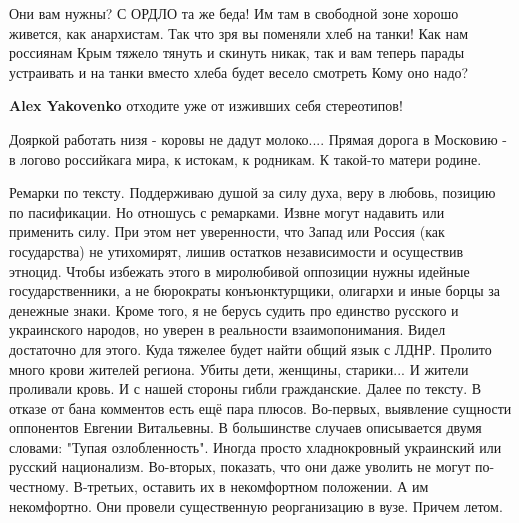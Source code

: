 \begin{itemize}
\begin{itemize}
Они вам нужны? С ОРДЛО та же беда! Им там в свободной зоне хорошо живется, как
анархистам. Так что зря вы поменяли хлеб на танки! Как нам россиянам Крым
тяжело тянуть и скинуть никак, так и вам теперь парады устраивать и на танки
вместо хлеба будет весело смотреть Кому оно надо?

 
\textbf{Alex Yakovenko} отходите уже от изживших себя стереотипов!

\end{itemize}

 

Дояркой работать низя - коровы не дадут молоко.... Прямая дорога в Московию - в
логово российкага мира, к истокам, к родникам. К такой-то матери родине.


 

Ремарки по тексту. Поддерживаю душой за силу духа, веру в любовь, позицию по
пасификации. Но отношусь с ремарками. Извне могут надавить или применить силу.
При этом нет уверенности, что Запад или Россия (как государства) не утихомирят,
лишив остатков независимости и осуществив этноцид. Чтобы избежать этого в
миролюбивой оппозиции нужны идейные государственники, а не бюрократы
конъюнктурщики, олигархи и иные борцы за денежные знаки. Кроме того, я не
берусь судить про единство русского и украинского народов, но уверен в
реальности взаимопонимания. Видел достаточно для этого. Куда тяжелее будет
найти общий язык с ЛДНР. Пролито много крови жителей региона. Убиты дети,
женщины, старики... И жители проливали кровь. И с нашей стороны гибли
гражданские. Далее по тексту. В отказе от бана комментов есть ещё пара плюсов.
Во-первых, выявление сущности оппонентов Евгении Витальевны. В большинстве
случаев описывается двумя словами: "Тупая озлобленность". Иногда просто
хладнокровный украинский или русский национализм. Во-вторых, показать, что они
даже уволить не могут по-честному. В-третьих, оставить их в некомфортном
положении. А им некомфортно. Они провели существенную реорганизацию в вузе.
Причем летом.


\end{itemize}
